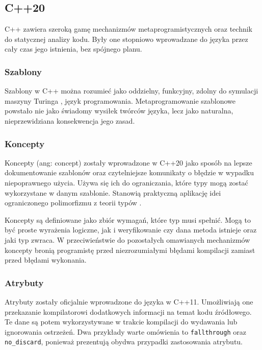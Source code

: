 \subsection{C++20}
C++ \cite{ISO:cpp20} zawiera szeroką gamę mechanizmów metaprogramistycznych oraz technik do statycznej analizy kodu. Były one stopniowo wprowadzane do języka przez cały czas jego istnienia, bez spójnego planu.\par
\subsubsection{Szablony}
Szablony w C++ można rozumieć jako oddzielny, funkcyjny, zdolny do symulacji maszyny Turinga \cite{template_turing_complete}, język programowania.
Metaprogramowanie szablonowe powstało nie jako świadomy wysiłek twórców języka, lecz jako naturalna, nieprzewidziana konsekwencja jego zasad.

\subsubsection{Koncepty}
Koncepty (ang: concept) zostały wprowadzone w C++20 \cite{ISO:cpp20} jako sposób na lepsze dokumentowanie szablonów oraz czytelniejsze komunikaty o błędzie w wypadku niepoprawnego użycia.
Używa się ich do ograniczania, które typy mogą zostać wykorzystane w danym szablonie.
Stanowią praktyczną aplikację idei ograniczonego polimorfizmu z teorii typów \cite{Cardelli85onunderstanding}.

Koncepty są definiowane jako zbiór wymagań, które typ musi spełnić.
Mogą to być proste wyrażenia logiczne, jak i weryfikowanie czy dana metoda istnieje oraz jaki typ zwraca.
W przeciwieństwie do pozostałych omawianych mechanizmów koncepty bronią programistę przed niezrozumiałymi błędami kompilacji zamiast przed błędami wykonania.

\subsubsection{Atrybuty}
Atrybuty zostały oficjalnie wprowadzone do języka w C++11\cite{ISO:2012:III}. 
Umożliwiają one przekazanie kompilatorowi dodatkowych informacji na temat kodu źródłowego.
Te dane są potem wykorzystywane w trakcie kompilacji do wydawania lub ignorowania ostrzeżeń.
Dwa przykłady warte omówienia to \lstinline{fallthrough} oraz \lstinline{no_discard}, ponieważ prezentują obydwa przypadki zastosowania atrybutu.

